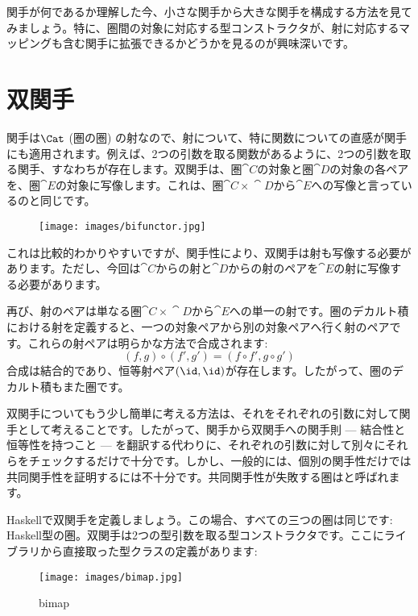 
\lettrine[lhang=0.17]{関}{手}が何であるか理解した今、小さな関手から大きな関手を構成する方法を見てみましょう。特に、圏間の対象に対応する型コンストラクタが、射に対応するマッピングも含む関手に拡張できるかどうかを見るのが興味深いです。

\section{双関手}

関手は$\Cat$ (圏の圏) の射なので、射について、特に関数についての直感が関手にも適用されます。例えば、2つの引数を取る関数があるように、2つの引数を取る関手、すなわちが存在します。双関手は、圏$\cat{C}$の対象と圏$\cat{D}$の対象の各ペアを、圏$\cat{E}$の対象に写像します。これは、圏$\cat{C}\times{}\cat{D}$から$\cat{E}$への写像と言っているのと同じです。

\begin{figure}[H]
  \centering\texttt{[image: images/bifunctor.jpg]}
\end{figure}

\noindent
これは比較的わかりやすいですが、関手性により、双関手は射も写像する必要があります。ただし、今回は$\cat{C}$からの射と$\cat{D}$からの射のペアを$\cat{E}$の射に写像する必要があります。

再び、射のペアは単なる圏$\cat{C}\times{}\cat{D}$から$\cat{E}$への単一の射です。圏のデカルト積における射を定義すると、一つの対象ペアから別の対象ペアへ行く射のペアです。これらの射ペアは明らかな方法で合成されます: 
\[(f, g) \circ (f', g') = (f \circ f', g \circ g')\]
合成は結合的であり、恒等射ペア$(\id, \id)$が存在します。したがって、圏のデカルト積もまた圏です。

双関手についてもう少し簡単に考える方法は、それをそれぞれの引数に対して関手として考えることです。したがって、関手から双関手への関手則 --- 結合性と恒等性を持つこと --- を翻訳する代わりに、それぞれの引数に対して別々にそれらをチェックするだけで十分です。しかし、一般的には、個別の関手性だけでは共同関手性を証明するには不十分です。共同関手性が失敗する圏はと呼ばれます。

Haskellで双関手を定義しましょう。この場合、すべての三つの圏は同じです: Haskell型の圏。双関手は2つの型引数を取る型コンストラクタです。ここにライブラリから直接取った型クラスの定義があります: 


\begin{figure}[H]
  \centering\texttt{[image: images/bimap.jpg]}
  \caption{bimap}
\end{figure}

